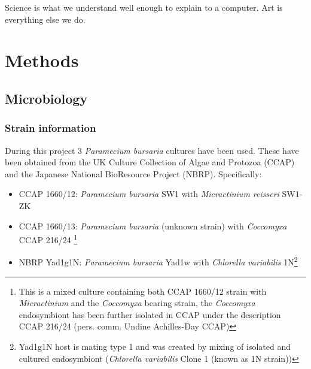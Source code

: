 \graphicspath{{chapters/2.Methods/figures/}}


\begin{savequote}[75mm]
    Science is what we understand well enough to explain to a computer. Art is everything else we do.
\end{savequote}

\chapter{Methods}

\section{Microbiology}
\subsection{Strain information}
During this project 3 \textit{Paramecium bursaria} cultures have been used.  These have been obtained from 
the UK Culture Collection of Algae and Protozoa (CCAP) and the Japanese National BioResource Project (NBRP).
Specifically:
\begin{itemize}
    \item CCAP 1660/12: \textit{Paramecium bursaria} SW1 with \textit{Micractinium reisseri} SW1-ZK \citep{Hoshina2010}
    \item CCAP 1660/13: \textit{Paramecium bursaria} (unknown strain) with \textit{Coccomyxa} CCAP 216/24 \footnote{This is a mixed culture 
            containing both CCAP 1660/12 strain with \textit{Micractinium} and the \textit{Coccomyxa} bearing strain, 
        the \textit{Coccomyxa} endosymbiont has been further isolated in CCAP under the description CCAP 216/24 (pers. comm. Undine Achilles-Day CCAP)}
    \item NBRP Yad1g1N: \textit{Paramecium bursaria} Yad1w with \textit{Chlorella variabilis} 1N\footnote{
        Yad1g1N host is mating type 1 and was created by mixing of isolated and 
        cultured endosymbiont (\textit{Chlorella variabilis} Clone 1 (known as 1N strain))
        }
\end{itemize}

